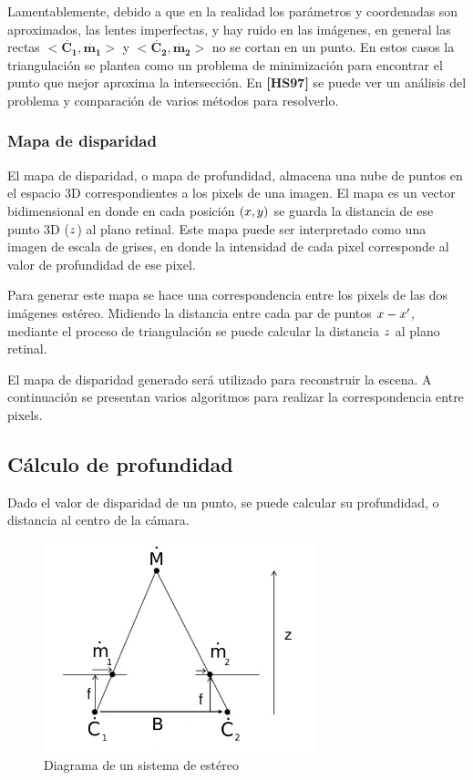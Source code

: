 \documentclass[11pt,a4paper,titlepage]{article}
\newcommand{\Cite}[1]{\textbf{[#1]}}
\newcommand{\Scalar}[1]{\ensuremath{\mathnormal{#1}}}
\newcommand{\TwoCart}[1]{\ensuremath{\mathbf{\dot{#1}}}}
\newcommand{\ThreeCart}[1]{\ensuremath{\mathbf{\dot{#1}}}}
\begin{document}
Lamentablemente, debido a que en la realidad los parámetros y coordenadas son aproximados, las lentes imperfectas, y hay ruido en las imágenes, en general las rectas $<\ThreeCart{C_1}, \TwoCart{m_1}>$ y $<\ThreeCart{C_2}, \TwoCart{m_2}>$ no se cortan en un punto. En estos casos la triangulación se plantea como un problema de minimización para encontrar el punto que mejor aproxima la intersección. En \Cite{HS97} se puede ver un análisis del problema y comparación de varios métodos para resolverlo.

\subsubsection{Mapa de disparidad}

El mapa de disparidad, o mapa de profundidad, almacena una nube de puntos en el espacio 3D correspondientes a los pixels de una imagen. El mapa es un vector bidimensional en donde en cada posición $(\Scalar{x}, \Scalar{y})$ se guarda la distancia de ese punto 3D (\Scalar{z}) al plano retinal. Este mapa puede ser interpretado como una imagen de escala de grises, en donde la intensidad de cada pixel corresponde al valor de profundidad de ese pixel.

Para generar este mapa se hace una correspondencia entre los pixels de las dos imágenes estéreo. Midiendo la distancia entre cada par de puntos $\Scalar{x} - \Scalar{x'}$, mediante el proceso de triangulación se puede calcular la distancia \Scalar{z} al plano retinal.

El mapa de disparidad generado será utilizado para reconstruir la escena. A continuación se presentan varios algoritmos para realizar la correspondencia entre pixels.

\subsection{Cálculo de profundidad}

Dado el valor de disparidad de un punto, se puede calcular su profundidad, o distancia al centro de la cámara.

\begin{figure}[h!]
  \centering
    \includegraphics[width=0.7\textwidth]{fnew.png}
  \caption{Diagrama de un sistema de estéreo}
\end{figure}
\end{document}
